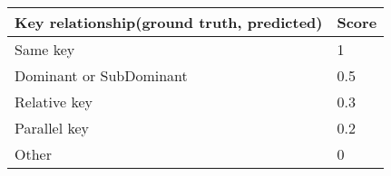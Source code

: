 \begin{tabular}{l|l}
Key relationship(ground truth, predicted) & Score \\
\hline
Same key                                  & 1     \\
Dominant or SubDominant                   & 0.5   \\
Relative key                              & 0.3   \\
Parallel key                              & 0.2   \\
Other                                     & 0    
\end{tabular}
